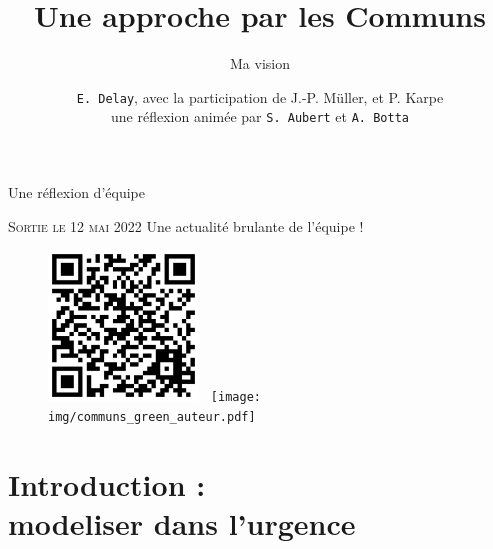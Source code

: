 \documentclass[newPxFont]{beamer}
\title{Une approche par les Communs}
\subtitle{Ma vision}
\author{\texttt{E. Delay}, \small{avec la participation de J.-P. Müller, et P. Karpe}\\
 une réflexion animée par \texttt{S. Aubert} et \texttt{A. Botta}}
\institute{CIRAD -- UMR SENS}
\begin{document}
%
%


\maketitle


%
%


\begin{frame}[c]{Une réflexion d'équipe}
\vspace{-1cm}
\begin{alertblock}{\textsc{ Sortie le 12 mai 2022}}
    Une actualité brulante de l'équipe !
\end{alertblock}
\begin{figure}
  \includegraphics[height=4cm]{img/qrcode_quae.png}~
  \texttt{[image: img/communs\_green\_auteur.pdf]}
\end{figure}
\end{frame}

\section{Introduction :\\ modeliser dans l'urgence}
\end{document}
